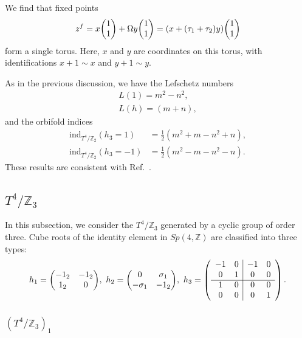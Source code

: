 \documentclass[11pt]{article}
\newcommand{\Lef}{Lefschetz }
\begin{document}
We find that fixed points
\begin{align}
    z^f= x\mqty( 1 \\ 1 )+ \Omega y \mqty(1 \\ 1)= (x+ (\tau_1+\tau_2)y )\mqty(1 \\ 1)
\end{align}
form a single torus. Here, $x$ and $y$ are coordinates on this torus, with identifications $x+1 \sim x$ and $y+1 \sim y$.


As in the previous discussion, we have the \Lef numbers 
\begin{align}
L(1)=m^2-n^2, \\
L(h)= (m+n) ,
\end{align}
and the orbifold indices
\begin{align}
    \text{ind}_{T^4/\mathbb{Z}_2}(h_3=1)&= \frac{1}{2}(m^2 +m -n^2+n ), \\
    \text{ind}_{T^4/\mathbb{Z}_2}(h_3=-1)&=\frac{1}{2}(m^2 -m -n^2-n ).
\end{align}
These results are consistent with Ref.~\cite{Kikuchi:2022psj}.


\subsection{ $T^4/ \mathbb{Z}_3$}

In this subsection, we consider the $T^4/ \mathbb{Z}_3$ generated by a cyclic group of order three. Cube roots of the identity element in $Sp(4,\mathbb{Z})$ are classified into three types:
\begin{align}
    h_1= \mqty(- 1_2 & -1_2 \\ 1_2 & 0),~h_2=\mqty( 0 & \sigma_1 \\ -\sigma_1 & -1_2),~ h_3=\left(\begin{array}{cc|cc}
-1 & 0 & -1 & 0 \\ 
0 & 1 & 0 & 0 \\ \cline{1-4}
1 &0 &0 & 0 \\
0 & 0 & 0 & 1  
\end{array}\right).
\end{align}


\subsubsection{$(T^4/ \mathbb{Z}_3)_1$}
\end{document}
